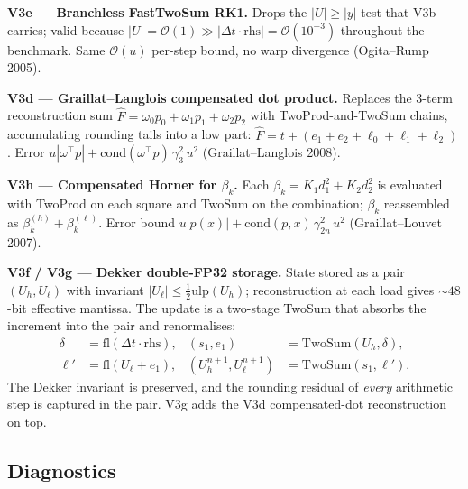 \documentclass[11pt,a4paper]{article}
\begin{document}
\textbf{V3e --- Branchless FastTwoSum RK1.}  Drops the
\(|U|\ge|y|\) test that V3b carries; valid because
\(|U|=\mathcal{O}(1) \gg |\Delta t\cdot\mathrm{rhs}|=\mathcal{O}(10^{-3})\)
throughout the benchmark.  Same \(\mathcal{O}(u)\) per-step bound, no
warp divergence (Ogita--Rump 2005).

\textbf{V3d --- Graillat--Langlois compensated dot product.}
Replaces the 3-term reconstruction sum
\(\hat F = \omega_0 p_0 + \omega_1 p_1 + \omega_2 p_2\) with
TwoProd-and-TwoSum chains, accumulating rounding tails into a low
part: \(\hat F = t + (e_1 + e_2 + \ell_0 + \ell_1 + \ell_2)\). Error
\(u|\omega^\top p| + \mathrm{cond}(\omega^\top p)\,\gamma_3^2\,u^2\)
(Graillat--Langlois 2008).

\textbf{V3h --- Compensated Horner for \(\beta_k\).}  Each
\(\beta_k = K_1 d_1^2 + K_2 d_2^2\) is evaluated with TwoProd on each
square and TwoSum on the combination; \(\beta_k\) reassembled as
\(\beta_k^{(h)} + \beta_k^{(\ell)}\). Error bound
\(u|p(x)| + \mathrm{cond}(p,x)\,\gamma_{2n}^2\,u^2\)
(Graillat--Louvet 2007).

\textbf{V3f / V3g --- Dekker double-FP32 storage.}  State stored as a
pair \((U_h, U_\ell)\) with invariant
\(|U_\ell|\le\tfrac{1}{2}\mathrm{ulp}(U_h)\); reconstruction at each
load gives \(\sim\!48\)-bit effective mantissa. The update is a
two-stage TwoSum that absorbs the increment into the pair and
renormalises:
\begin{equation}
\begin{aligned}
\delta &= \mathrm{fl}(\Delta t\cdot\mathrm{rhs}), &
(s_1,e_1) &= \mathrm{TwoSum}(U_h, \delta), \\
\ell' &= \mathrm{fl}(U_\ell + e_1), &
(U_h^{n+1}, U_\ell^{n+1}) &= \mathrm{TwoSum}(s_1, \ell').
\end{aligned}
\end{equation}
The Dekker invariant is preserved, and the rounding residual of
\emph{every} arithmetic step is captured in the pair. V3g adds the
V3d compensated-dot reconstruction on top.

\subsection{Diagnostics}
\label{sec:diagnostics}
\end{document}
